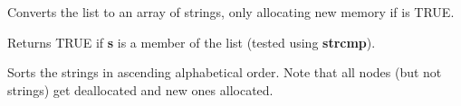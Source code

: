 Converts the list to an array of strings, only allocating new memory if
 is TRUE.



Returns TRUE if {\bf s} is a member of the list (tested using {\bf strcmp}).



Sorts the strings in ascending alphabetical order. Note that all nodes
(but not strings) get deallocated and new ones allocated.


